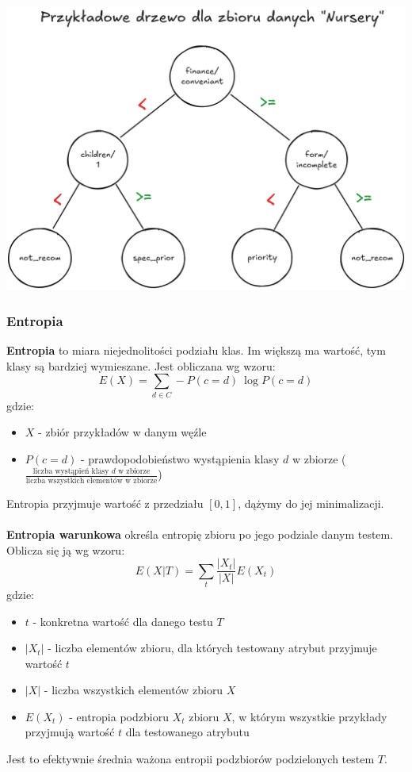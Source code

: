 \documentclass[11pt]{article}
\begin{document}
\begin{center}
\includegraphics[width=.8\linewidth]{./images/example-nursery-tree.png}
\end{center}

\pagebreak

\subsubsection{Entropia}
\label{ent}\textbf{Entropia} to miara niejednolitości podziału klas. Im większą ma wartość, tym klasy są bardziej wymieszane. Jest obliczana wg wzoru:
$$
E(X) = \sum_{d \in C} -P(c = d)\ \log P(c = d)
$$
gdzie:
\begin{itemize}
\item $X$ - zbiór przykładów w danym węźle
\item $P(c = d)$ - prawdopodobieństwo wystąpienia klasy $d$ w zbiorze ($\frac{\text{liczba wystąpień klasy $d$ w zbiorze}}{\text{liczba wszystkich elementów w zbiorze}}$)
\end{itemize}
Entropia przyjmuje wartość z przedziału $[0,1]$, dążymy do jej minimalizacji.
\\\\
\label{entwar}\textbf{Entropia warunkowa} określa entropię zbioru po jego podziale danym testem. Oblicza się ją wg wzoru:
$$
E(X|T) = \sum_{t} \frac{|X_t|}{|X|} E(X_t)
$$
gdzie:
\begin{itemize}
\item $t$ - konkretna wartość dla danego testu $T$
\item $|X_t|$ - liczba elementów zbioru, dla których testowany atrybut przyjmuje wartość $t$
\item $|X|$ - liczba wszystkich elementów zbioru $X$
\item $E(X_t)$ - entropia podzbioru $X_t$ zbioru $X$, w którym wszystkie przykłady przyjmują wartość $t$ dla testowanego atrybutu
\end{itemize}
Jest to efektywnie średnia ważona entropii podzbiorów podzielonych testem $T$.
\end{document}
